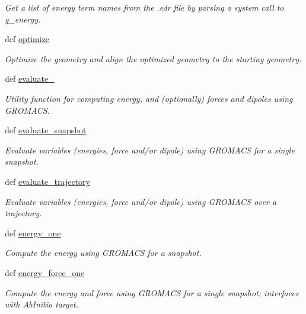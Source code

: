 \begin{DoxyCompactItemize}
\begin{DoxyCompactList}\small\item\em Get a list of energy term names from the .edr file by parsing a system call to g\-\_\-energy. \end{DoxyCompactList}\item 
def \hyperlink{classforcebalance_1_1gmxio_1_1GMX_a26446fe0d7708c321fb39a2944ca5625}{optimize}
\begin{DoxyCompactList}\small\item\em Optimize the geometry and align the optimized geometry to the starting geometry. \end{DoxyCompactList}\item 
def \hyperlink{classforcebalance_1_1gmxio_1_1GMX_a7f7d4d73a0034aa73bfd283ade0c066f}{evaluate\-\_\-}
\begin{DoxyCompactList}\small\item\em Utility function for computing energy, and (optionally) forces and dipoles using G\-R\-O\-M\-A\-C\-S. \end{DoxyCompactList}\item 
def \hyperlink{classforcebalance_1_1gmxio_1_1GMX_ad109af3f282dcdb9fd1b0caef17a376d}{evaluate\-\_\-snapshot}
\begin{DoxyCompactList}\small\item\em Evaluate variables (energies, force and/or dipole) using G\-R\-O\-M\-A\-C\-S for a single snapshot. \end{DoxyCompactList}\item 
def \hyperlink{classforcebalance_1_1gmxio_1_1GMX_ad668b34d372ed71bea3a33a9cc572a77}{evaluate\-\_\-trajectory}
\begin{DoxyCompactList}\small\item\em Evaluate variables (energies, force and/or dipole) using G\-R\-O\-M\-A\-C\-S over a trajectory. \end{DoxyCompactList}\item 
def \hyperlink{classforcebalance_1_1gmxio_1_1GMX_a31422e0fa886932432372dbbed214b10}{energy\-\_\-one}
\begin{DoxyCompactList}\small\item\em Compute the energy using G\-R\-O\-M\-A\-C\-S for a snapshot. \end{DoxyCompactList}\item 
def \hyperlink{classforcebalance_1_1gmxio_1_1GMX_ab1a441fd9c26573ac02e6e987ed29547}{energy\-\_\-force\-\_\-one}
\begin{DoxyCompactList}\small\item\em Compute the energy and force using G\-R\-O\-M\-A\-C\-S for a single snapshot; interfaces with Ab\-Initio target. \end{DoxyCompactList}\item 

\end{DoxyCompactItemize}

